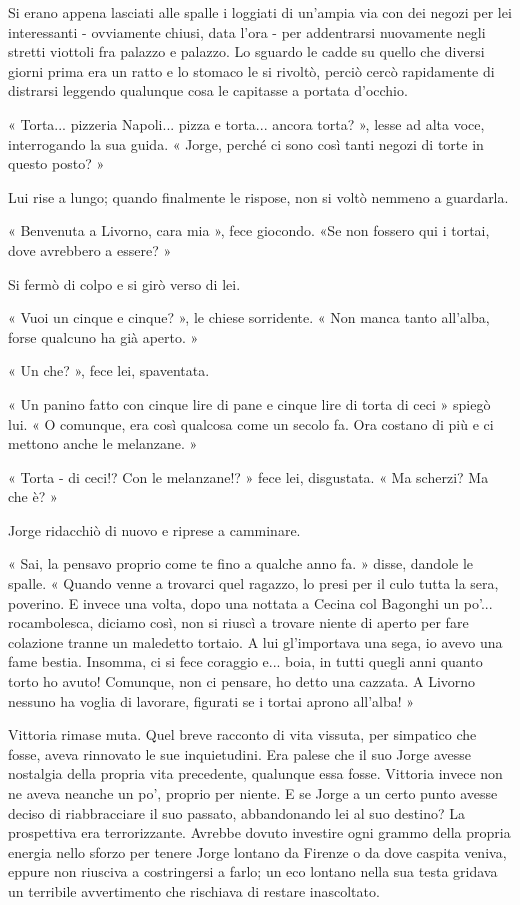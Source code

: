 Si erano appena lasciati alle spalle i loggiati di un'ampia via con dei negozi per lei interessanti - ovviamente chiusi, data l'ora - per addentrarsi nuovamente negli stretti viottoli fra palazzo e palazzo. Lo sguardo le cadde su quello che diversi giorni prima era un ratto e lo stomaco le si rivoltò, perciò cercò rapidamente di distrarsi leggendo qualunque cosa le capitasse a portata d'occhio.

« Torta... pizzeria Napoli... pizza e torta... ancora torta? », lesse ad alta voce, interrogando la sua guida. « Jorge, perché ci sono così tanti negozi di torte in questo posto? »

Lui rise a lungo; quando finalmente le rispose, non si voltò nemmeno a guardarla.

« Benvenuta a Livorno, cara mia », fece giocondo. «Se non fossero qui i tortai, dove avrebbero a essere? »

Si fermò di colpo e si girò verso di lei.

« Vuoi un cinque e cinque? », le chiese sorridente. « Non manca tanto all'alba, forse qualcuno ha già aperto. »

« Un che? », fece lei, spaventata.

« Un panino fatto con cinque lire di pane e cinque lire di torta di ceci » spiegò lui. « O comunque, era così qualcosa come un secolo fa. Ora costano di più e ci mettono anche le melanzane. »

« Torta - di ceci!? Con le melanzane!? » fece lei, disgustata. « Ma scherzi? Ma che è? »

Jorge ridacchiò di nuovo e riprese a camminare.

« Sai, la pensavo proprio come te fino a qualche anno fa. » disse, dandole le spalle. « Quando venne a trovarci quel ragazzo, lo presi per il culo tutta la sera, poverino. E invece una volta, dopo una nottata a Cecina col Bagonghi un po'... rocambolesca, diciamo così, non si riuscì a trovare niente di aperto per fare colazione tranne un maledetto tortaio. A lui gl'importava una sega, io avevo una fame bestia. Insomma, ci si fece coraggio e... boia, in tutti quegli anni quanto torto ho avuto! Comunque, non ci pensare, ho detto una cazzata. A Livorno nessuno ha voglia di lavorare, figurati se i tortai aprono all'alba! »

Vittoria rimase muta. Quel breve racconto di vita vissuta, per simpatico che fosse, aveva rinnovato le sue inquietudini. Era palese che il suo Jorge avesse nostalgia della propria vita precedente, qualunque essa fosse. Vittoria invece non ne aveva neanche un po', proprio per niente. E se Jorge a un certo punto avesse deciso di riabbracciare il suo passato, abbandonando lei al suo destino? La prospettiva era terrorizzante. Avrebbe dovuto investire ogni grammo della propria energia nello sforzo per tenere Jorge lontano da Firenze o da dove caspita veniva, eppure non riusciva a costringersi a farlo; un eco lontano nella sua testa gridava un terribile avvertimento che rischiava di restare inascoltato.

